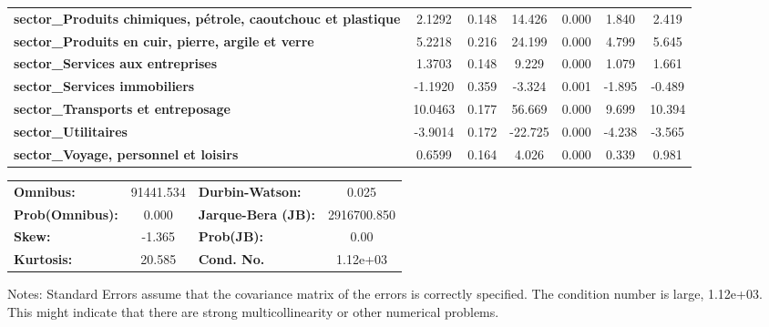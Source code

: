 \begin{center}
\begin{tabular}{lcccccc}
\textbf{sector\_Produits chimiques, pétrole, caoutchouc et plastique} &       2.1292  &        0.148     &    14.426  &         0.000        &        1.840    &        2.419     \\
\textbf{sector\_Produits en cuir, pierre, argile et verre}            &       5.2218  &        0.216     &    24.199  &         0.000        &        4.799    &        5.645     \\
\textbf{sector\_Services aux entreprises}                             &       1.3703  &        0.148     &     9.229  &         0.000        &        1.079    &        1.661     \\
\textbf{sector\_Services immobiliers}                                 &      -1.1920  &        0.359     &    -3.324  &         0.001        &       -1.895    &       -0.489     \\
\textbf{sector\_Transports et entreposage}                            &      10.0463  &        0.177     &    56.669  &         0.000        &        9.699    &       10.394     \\
\textbf{sector\_Utilitaires}                                          &      -3.9014  &        0.172     &   -22.725  &         0.000        &       -4.238    &       -3.565     \\
\textbf{sector\_Voyage, personnel et loisirs}                         &       0.6599  &        0.164     &     4.026  &         0.000        &        0.339    &        0.981     \\
\bottomrule
\end{tabular}
\begin{tabular}{lclc}
\textbf{Omnibus:}       & 91441.534 & \textbf{  Durbin-Watson:     } &      0.025   \\
\textbf{Prob(Omnibus):} &    0.000  & \textbf{  Jarque-Bera (JB):  } & 2916700.850  \\
\textbf{Skew:}          &   -1.365  & \textbf{  Prob(JB):          } &       0.00   \\
\textbf{Kurtosis:}      &   20.585  & \textbf{  Cond. No.          } &   1.12e+03   \\
\bottomrule
\end{tabular}
\end{center}

Notes: \newline
 [1] Standard Errors assume that the covariance matrix of the errors is correctly specified. \newline
 [2] The condition number is large, 1.12e+03. This might indicate that there are \newline
 strong multicollinearity or other numerical problems.